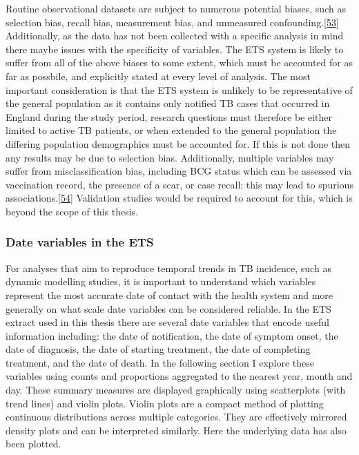\documentclass[11pt,twoside]{bristolthesis}
\begin{document}
  Routine observational datasets are subject to numerous potential biases, such as selection bias, recall bias, measurement bias, and unmeasured confounding.{[}\protect\hyperlink{ref-Benchimol2016a}{53}{]} Additionally, as the data has not been collected with a specific analysis in mind there maybe issues with the specificity of variables. The ETS system is likely to suffer from all of the above biases to some extent, which must be accounted for as far as possbile, and explicitly stated at every level of analysis. The most important consideration is that the ETS system is unlikely to be representative of the general population as it contains only notified TB cases that occurred in England during the study period, research questions must therefore be either limited to active TB patients, or when extended to the general population the differing population demographics must be accounted for. If this is not done then any results may be due to selection bias. Additionally, multiple variables may suffer from misclassification bias, including BCG status which can be assessed via vaccination record, the presence of a scar, or case recall: this may lead to spurious associations.{[}\protect\hyperlink{ref-Fewell2007}{54}{]} Validation studies would be required to account for this, which is beyond the scope of this thesis.
  
  \hypertarget{date-variables-in-the-ets}{%
  \subsubsection{Date variables in the ETS}\label{date-variables-in-the-ets}}
  
  For analyses that aim to reproduce temporal trends in TB incidence, such as dynamic modelling studies, it is important to understand which variables represent the most accurate date of contact with the health system and more generally on what scale date variables can be considered reliable. In the ETS extract used in this thesis there are several date variables that encode useful information including: the date of notification, the date of symptom onset, the date of diagnosis, the date of starting treatment, the date of completing treatment, and the date of death. In the following section I explore these variables using counts and proportions aggregated to the nearest year, month and day. These summary measures are displayed graphically using scatterplots (with trend lines) and violin plots. Violin plots are a compact method of plotting continuous distributions across multiple categories. They are effectively mirrored density plots and can be interpreted similarly. Here the underlying data has also been plotted.
  
\end{document}

